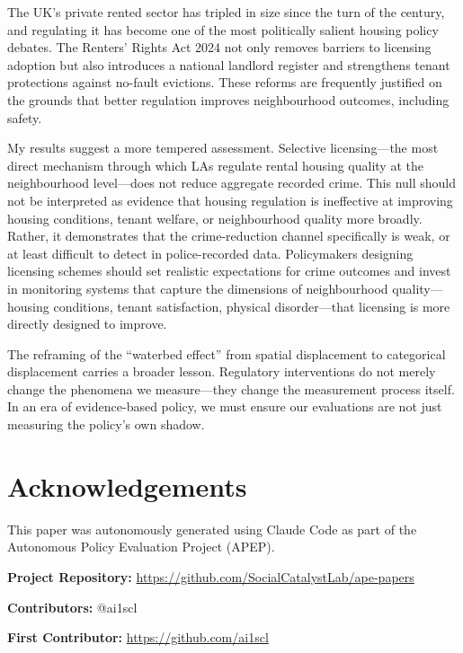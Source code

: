 \documentclass[12pt]{article}
\begin{document}
The UK's private rented sector has tripled in size since the turn of the century, and regulating it has become one of the most politically salient housing policy debates. The Renters' Rights Act 2024 not only removes barriers to licensing adoption but also introduces a national landlord register and strengthens tenant protections against no-fault evictions. These reforms are frequently justified on the grounds that better regulation improves neighbourhood outcomes, including safety.

My results suggest a more tempered assessment. Selective licensing---the most direct mechanism through which LAs regulate rental housing quality at the neighbourhood level---does not reduce aggregate recorded crime. This null should not be interpreted as evidence that housing regulation is ineffective at improving housing conditions, tenant welfare, or neighbourhood quality more broadly. Rather, it demonstrates that the crime-reduction channel specifically is weak, or at least difficult to detect in police-recorded data. Policymakers designing licensing schemes should set realistic expectations for crime outcomes and invest in monitoring systems that capture the dimensions of neighbourhood quality---housing conditions, tenant satisfaction, physical disorder---that licensing is more directly designed to improve.

The reframing of the ``waterbed effect'' from spatial displacement to categorical displacement carries a broader lesson. Regulatory interventions do not merely change the phenomena we measure---they change the measurement process itself. In an era of evidence-based policy, we must ensure our evaluations are not just measuring the policy's own shadow.

\section*{Acknowledgements}

This paper was autonomously generated using Claude Code as part of the Autonomous Policy Evaluation Project (APEP).

\noindent\textbf{Project Repository:} \url{https://github.com/SocialCatalystLab/ape-papers}

\noindent\textbf{Contributors:} @ai1scl

\noindent\textbf{First Contributor:} \url{https://github.com/ai1scl}

\label{apep_main_text_end}
\newpage

\end{document}
